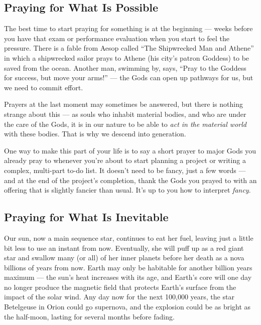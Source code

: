 \documentclass[
]{book}
\begin{document}
\hypertarget{praying-for-what-is-possible}{%
\subsection{Praying for What Is Possible}\label{praying-for-what-is-possible}}

The best time to start praying for something is at the beginning --- weeks before you have that exam or performance evaluation when you start to feel the pressure. There is a fable from Aesop called ``The Shipwrecked Man and Athene'' in which a shipwrecked sailor prays to Athene (his city's patron Goddess) to be saved from the ocean. Another man, swimming by, says, ``Pray to the Goddess for success, but move your arms!'' --- the Gods can open up pathways for us, but we need to commit effort.

Prayers at the last moment may sometimes be answered, but there is nothing strange about this --- as souls who inhabit material bodies, and who are under the care of the Gods, it is in our nature to be able to \emph{act in the material world} with these bodies. That is why we descend into generation.

One way to make this part of your life is to say a short prayer to major Gods you already pray to whenever you're about to start planning a project or writing a complex, multi-part to-do list. It doesn't need to be fancy, just a few words --- and at the end of the project's completion, thank the Gods you prayed to with an offering that is slightly fancier than usual. It's up to you how to interpret \emph{fancy}.

\hypertarget{praying-for-what-is-inevitable}{%
\subsection{Praying for What Is Inevitable}\label{praying-for-what-is-inevitable}}

Our sun, now a main sequence star, continues to eat her fuel, leaving just a little bit less to use an instant from now. Eventually, she will puff up as a red giant star and swallow many (or all) of her inner planets before her death as a nova billions of years from now. Earth may only be habitable for another billion years maximum --- the sun's heat increases with its age, and Earth's core will one day no longer produce the magnetic field that protects Earth's surface from the impact of the solar wind. Any day now for the next 100,000 years, the star Betelgeuse in Orion could go supernova, and the explosion could be as bright as the half-moon, lasting for several months before fading.
\end{document}
